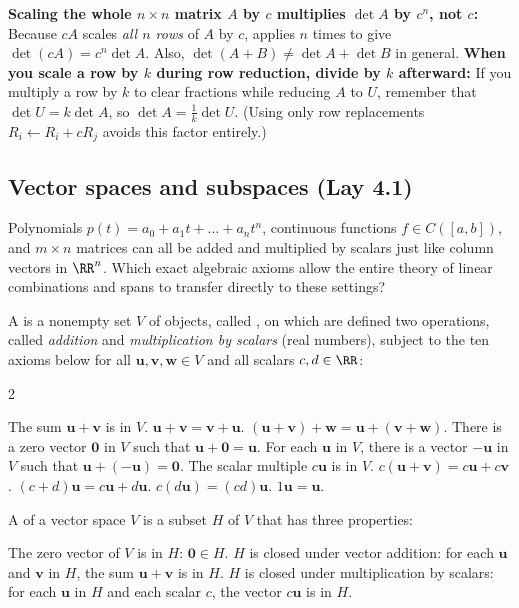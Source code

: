 \documentclass[10pt]{scrartcl}
\newcommand{\vv}[1]{\mathbf{#1}}
\begin{document}
\begin{trapbox}
  \ii \textbf{Scaling the whole $n\times n$ matrix $A$ by $c$ multiplies $\det A$ by $c^n$, not $c$:} Because $cA$ scales \emph{all $n$ rows} of $A$ by $c$,  applies $n$ times to give $\det(cA)=c^n\det A$. Also, $\det(A+B)\ne\det A+\det B$ in general.
  \ii \textbf{When you scale a row by $k$ during row reduction, divide by $k$ afterward:} If you multiply a row by $k$ to clear fractions while reducing $A$ to $U$, remember that $\det U=k\det A$, so $\det A=\frac{1}{k}\det U$. (Using only row replacements $R_i\leftarrow R_i+cR_j$ avoids this factor entirely.)
\end{trapbox}

\subsection{Vector spaces and subspaces (Lay 4.1)}

\begin{qbox}
  Polynomials $p(t)=a_0+a_1t+\dots+a_nt^n$, continuous functions $f\in C([a,b])$, and $m\times n$ matrices can all be added and multiplied by scalars just like column vectors in $\RR^n$. Which exact algebraic axioms allow the entire theory of linear combinations and spans to transfer directly to these settings?
\end{qbox}

\begin{definition*}
  A  is a nonempty set $V$ of objects, called , on which are defined two operations, called \emph{addition} and \emph{multiplication by scalars} (real numbers), subject to the ten axioms below for all $\vv u,\vv v,\vv w\in V$ and all scalars $c,d\in\RR$:
  \begin{multicols}{2}
  \begin{enumerate}[(1),itemsep=1pt]
    \ii The sum $\vv u+\vv v$ is in $V$.
    \ii $\vv u+\vv v = \vv v+\vv u$.
    \ii $(\vv u+\vv v)+\vv w = \vv u+(\vv v+\vv w)$.
    \ii There is a zero vector $\vv 0$ in $V$ such that $\vv u+\vv 0=\vv u$.
    \ii For each $\vv u$ in $V$, there is a vector $-\vv u$ in $V$ such that $\vv u+(-\vv u)=\vv 0$.
    \ii The scalar multiple $c\vv u$ is in $V$.
    \ii $c(\vv u+\vv v) = c\vv u+c\vv v$.
    \ii $(c+d)\vv u = c\vv u+d\vv u$.
    \ii $c(d\vv u) = (cd)\vv u$.
    \ii $1\vv u = \vv u$.
  \end{enumerate}
  \end{multicols}
  A  of a vector space $V$ is a subset $H$ of $V$ that has three properties:
  \begin{enumerate}[(a)]
    \ii The zero vector of $V$ is in $H$: $\vv 0\in H$.
    \ii $H$ is closed under vector addition: for each $\vv u$ and $\vv v$ in $H$, the sum $\vv u+\vv v$ is in $H$.
    \ii $H$ is closed under multiplication by scalars: for each $\vv u$ in $H$ and each scalar $c$, the vector $c\vv u$ is in $H$.
  \end{enumerate}
\end{definition*}
\end{document}

